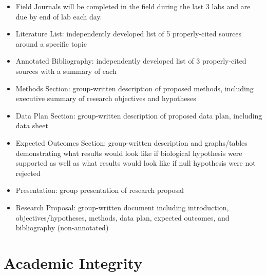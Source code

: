 \documentclass{tufte-handout}
\begin{document}
\begin{fullwidth}
\begin{itemize}
\item Field Journals will be completed in the field during the last 3 labs and are due by end of lab each day. 
\item Literature List: independently developed list of 5 properly-cited sources around a specific topic
\item Annotated Bibliography: independently developed list of 3 properly-cited sources with a summary of each 
\item Methods Section: group-written description of proposed methods, including executive summary of research objectives and hypotheses
\item Data Plan Section: group-written description of proposed data plan, including data sheet
\item Expected Outcomes Section: group-written description and graphs/tables demonstrating what results would look like if biological hypothesis were supported as well as what results would look like if null hypothesis were not rejected
\item Presentation: group presentation of research proposal
\item Research Proposal: group-written document including introduction, objectives/hypotheses, methods, data plan, expected outcomes, and bibliography (non-annotated)
\end{itemize}







\section{Academic Integrity}



\end{fullwidth}
\end{document}
